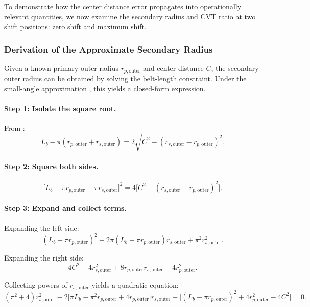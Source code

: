 \documentclass[11pt]{article}
\numberwithin{equation}{section}
\begin{document}
To demonstrate how the center distance error propagates into operationally
relevant quantities, we now examine the secondary radius and CVT ratio
at two shift positions: zero shift and maximum shift.

\subsubsection{Derivation of the Approximate Secondary Radius}

Given a known primary outer radius $r_{p,\text{outer}}$ and center distance $C$,
the secondary outer radius can be obtained by solving the belt-length
constraint. Under the small-angle approximation ,
this yields a closed-form expression.

\paragraph{Step 1: Isolate the square root.}

From :
\begin{equation}
L_b - \pi(r_{p,\text{outer}} + r_{s,\text{outer}})
=
2\sqrt{C^2 - (r_{s,\text{outer}} - r_{p,\text{outer}})^2}.
\end{equation}

\paragraph{Step 2: Square both sides.}

\begin{equation}
\bigl[L_b - \pi r_{p,\text{outer}} - \pi r_{s,\text{outer}}\bigr]^2
=
4\bigl[C^2 - (r_{s,\text{outer}} - r_{p,\text{outer}})^2\bigr].
\end{equation}

\paragraph{Step 3: Expand and collect terms.}

Expanding the left side:
\[
(L_b - \pi r_{p,\text{outer}})^2
- 2\pi(L_b - \pi r_{p,\text{outer}}) r_{s,\text{outer}}
+ \pi^2 r_{s,\text{outer}}^2.
\]

Expanding the right side:
\[
4C^2 - 4r_{s,\text{outer}}^2 + 8 r_{p,\text{outer}} r_{s,\text{outer}} - 4r_{p,\text{outer}}^2.
\]

Collecting powers of $r_{s,\text{outer}}$ yields a quadratic equation:
\begin{equation}
(\pi^2 + 4) r_{s,\text{outer}}^2
- 2\bigl[\pi L_b - \pi^2 r_{p,\text{outer}} + 4 r_{p,\text{outer}}\bigr] r_{s,\text{outer}}
+ \bigl[(L_b - \pi r_{p,\text{outer}})^2 + 4r_{p,\text{outer}}^2 - 4C^2\bigr]
= 0.
\end{equation}
\end{document}
